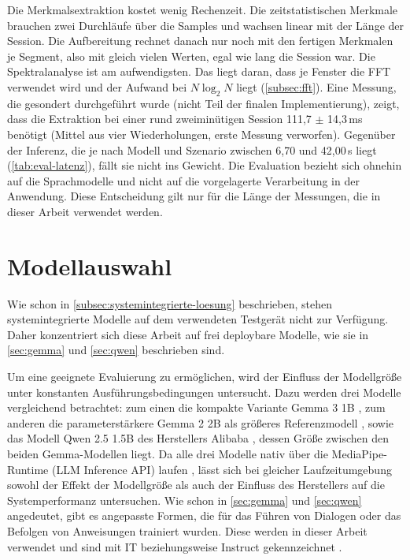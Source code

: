 \noindent Die Merkmalsextraktion kostet wenig Rechenzeit. Die zeitstatistischen Merkmale brauchen zwei Durchläufe über die Samples und wachsen linear mit der Länge der Session. Die Aufbereitung rechnet danach nur noch mit den fertigen Merkmalen je Segment, also mit gleich vielen Werten, egal wie lang die Session war. Die Spektralanalyse ist am aufwendigsten. Das liegt daran, dass je Fenster die \ac{FFT} verwendet wird und der Aufwand bei $N \log_2 N$ liegt (\autoref{subsec:fft}). Eine Messung, die gesondert durchgeführt wurde (nicht Teil der finalen Implementierung), zeigt, dass die Extraktion bei einer rund zweiminütigen Session 111,7 $\pm$ 14,3\,ms benötigt (Mittel aus vier Wiederholungen, erste Messung verworfen). Gegenüber der Inferenz, die je nach Modell und Szenario zwischen 6,70 und 42,00\,s liegt (\autoref{tab:eval-latenz}), fällt sie nicht ins Gewicht. Die Evaluation bezieht sich ohnehin auf die Sprachmodelle und nicht auf die vorgelagerte Verarbeitung in der Anwendung. Diese Entscheidung gilt nur für die Länge der Messungen, die in dieser Arbeit verwendet werden.

\section{Modellauswahl}
\label{sec:modellauswahl}
Wie schon in \autoref{subsec:systemintegrierte-loesung} beschrieben, stehen systemintegrierte Modelle auf dem verwendeten Testgerät nicht zur Verfügung. Daher konzentriert sich diese Arbeit auf frei deploybare Modelle, wie sie in \autoref{sec:gemma} und \autoref{sec:qwen} beschrieben sind.
\vspace{\baselineskip}

\noindent Um eine geeignete Evaluierung zu ermöglichen, wird der Einfluss der Modellgröße unter konstanten Ausführungsbedingungen untersucht. Dazu werden drei Modelle vergleichend betrachtet: zum einen die kompakte Variante Gemma 3 1B \autocite{gemma3_2025,mediapipe_llm}, zum anderen die parameterstärkere Gemma 2 2B als größeres Referenzmodell \autocite{gemma2_2024,mediapipe_llm}, sowie das Modell Qwen 2.5 1.5B des Herstellers Alibaba \autocite{qwen2025,mediapipe_llm}, dessen Größe zwischen den beiden Gemma-Modellen liegt. Da alle drei Modelle nativ über die MediaPipe-Runtime (LLM Inference API) laufen \autocite{mediapipe_llm}, lässt sich bei gleicher Laufzeitumgebung sowohl der Effekt der Modellgröße als auch der Einfluss des Herstellers auf die Systemperformanz untersuchen. Wie schon in \autoref{sec:gemma} und \autoref{sec:qwen} angedeutet, gibt es angepasste Formen, die für das Führen von Dialogen oder das Befolgen von Anweisungen trainiert wurden. Diese werden in dieser Arbeit verwendet und sind mit IT beziehungsweise Instruct gekennzeichnet \autocite{gemma3_litert,gemma2_litert,qwen_litert}.
\vspace{\baselineskip}

